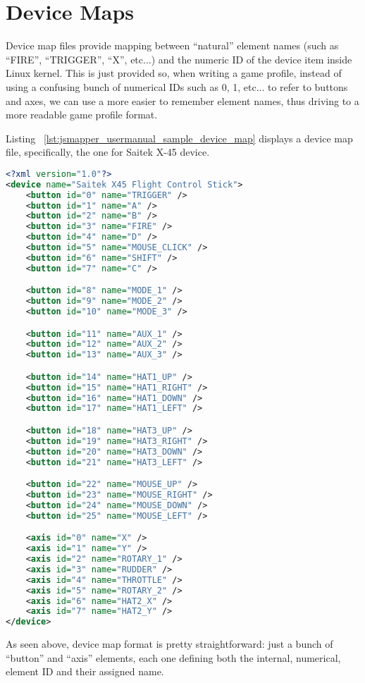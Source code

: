 \section{Device Maps}
Device map files provide mapping between ``natural'' element names (such as ``FIRE'', ``TRIGGER'', ``X'', etc...) and the numeric ID of the device item inside Linux kernel. This is just provided so, when writing a game profile, instead of using a confusing bunch of numerical IDs such as 0, 1, etc... to refer to buttons and axes, we can use a more easier to remember element names, thus driving to a more readable game profile format.

Listing ~\ref{lst:jsmapper_usermanual_sample_device_map} displays a device map file, specifically, the one for Saitek X-45 device.
\begin{lstlisting}[language=XML,caption={Saitek X-45 Device Map file},label={lst:jsmapper_usermanual_sample_device_map}]
<?xml version="1.0"?>
<device name="Saitek X45 Flight Control Stick">
	<button id="0" name="TRIGGER" />
	<button id="1" name="A" />
	<button id="2" name="B" />
	<button id="3" name="FIRE" />
	<button id="4" name="D" />
	<button id="5" name="MOUSE_CLICK" />
	<button id="6" name="SHIFT" />
	<button id="7" name="C" />

	<button id="8" name="MODE_1" />
	<button id="9" name="MODE_2" />
	<button id="10" name="MODE_3" />

	<button id="11" name="AUX_1" />
	<button id="12" name="AUX_2" />
	<button id="13" name="AUX_3" />

	<button id="14" name="HAT1_UP" />
	<button id="15" name="HAT1_RIGHT" />
	<button id="16" name="HAT1_DOWN" />
	<button id="17" name="HAT1_LEFT" />

	<button id="18" name="HAT3_UP" />
	<button id="19" name="HAT3_RIGHT" />
	<button id="20" name="HAT3_DOWN" />
	<button id="21" name="HAT3_LEFT" />

	<button id="22" name="MOUSE_UP" />
	<button id="23" name="MOUSE_RIGHT" />
	<button id="24" name="MOUSE_DOWN" />
	<button id="25" name="MOUSE_LEFT" />

	<axis id="0" name="X" />
	<axis id="1" name="Y" />
	<axis id="2" name="ROTARY_1" />
	<axis id="3" name="RUDDER" />
	<axis id="4" name="THROTTLE" />
	<axis id="5" name="ROTARY_2" />
	<axis id="6" name="HAT2_X" />
	<axis id="7" name="HAT2_Y" />
</device>
\end{lstlisting}

As seen above, device map format is pretty straightforward: just a bunch of ``button'' and ``axis'' elements, each one defining both the internal, numerical, element ID and their assigned name.

